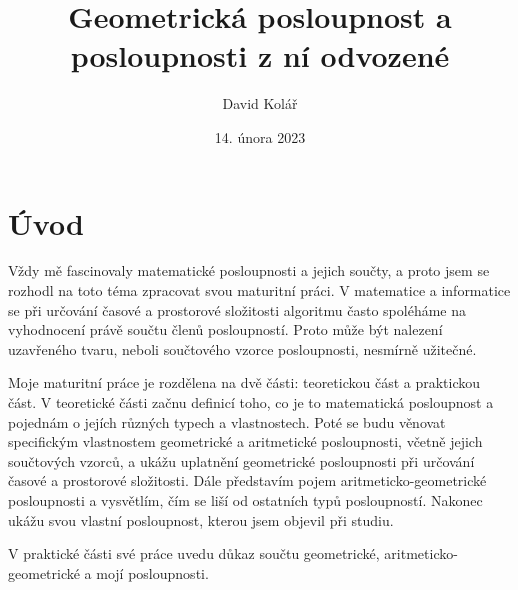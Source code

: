 \documentclass[12pt]{report}			%
\author{David Kolář}
\title{Geometrická posloupnost a posloupnosti z ní odvozené}
\date{14. února 2023}
\begin{document}
	\mytitlepage						%
	
	
	\abstrakt{
	
	}{
	}
	
	
   {\tableofcontents\newpage}			%
	
\addtocounter{page}{1}		%
	\chapter*{Úvod}
Vždy mě fascinovaly matematické posloupnosti a jejich součty, a proto jsem se rozhodl na toto téma zpracovat svou maturitní práci. V matematice a informatice se při určování časové a prostorové složitosti algoritmu často spoléháme na vyhodnocení právě součtu členů posloupností. Proto může být nalezení uzavřeného tvaru, neboli součtového vzorce posloupnosti, nesmírně užitečné.

Moje maturitní práce je rozdělena na dvě části: teoretickou část a praktickou část. 
V teoretické části začnu definicí toho, co je to matematická posloupnost a pojednám o jejích různých typech a vlastnostech. Poté se budu věnovat specifickým vlastnostem geometrické a aritmetické posloupnosti, včetně jejich součtových vzorců, a ukážu uplatnění geometrické posloupnosti při určování časové a prostorové složitosti. Dále představím pojem aritmeticko-geometrické posloupnosti a vysvětlím, čím se liší od ostatních typů posloupností. Nakonec ukážu svou vlastní posloupnost, kterou jsem objevil při studiu.

V praktické části své práce uvedu důkaz součtu geometrické, aritmeticko-geometrické a mojí posloupnosti. 
\end{document}
